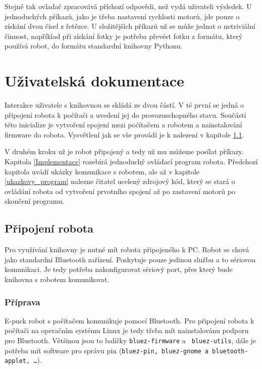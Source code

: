 \documentclass[12pt,notitlepage]{report}
\begin{document}
    Stejně tak ovladač zpracovává příchozí odpovědi, než vydá uživateli
    výsledek. U jednoduchých příkazů, jako je třeba nastavení rychlosti motorů,
    jde pouze o získání dvou čísel z řetězce. U složitějších příkazů už se může
    jednat o netriviální činnost, například při získání fotky je potřeba
    převést fotku z formátu, který používá robot, do formátu standardní
    knihovny Pythonu.

\chapter{Uživatelská dokumentace} %

    Interakce uživatele s knihovnou se skládá ze dvou částí. V té první se
    jedná o připojení robota k počítači a uvedení jej do provozuschopného
    stavu. Součástí této inicialize je vytvoření spojení mezi počítačem a
    robotem a nainstalování firmware do robota. Vysvětlení jak se vše provádí
    je k nalezení v kapitole \ref{pripojeni_robota}.

    V druhém kroku už je robot připojený a tedy už mu můžeme posílat příkazy.
    Kapitola \ref{Implementace} rozebírá jednoduchý ovládací program robota.
    Předchozí kapitola uvádí ukázky komunikace s robotem, ale až v kapitole
    \ref{ukazkovy_program} nalezne čitatel ucelený zdrojový kód, který se stará
    o ovládání robota od vytvoření prvotního spojení až po zastavení motorů po
    skončení programu.

    \section{Připojení robota}
    \label{pripojeni_robota}

    Pro využívání knihovny je nutné mít robota připojeného k PC. Robot se chová
    jako standardní Bluetooth zařízení. Poskytuje pouze jedinou službu a to
    sériovou komunikaci. Je tedy potřeba nakonfigurovat sériový port, přes
    který bude knihovna s robotem komunikovat.

    \subsection{Příprava}

    E-puck robot s počítačem komunikuje pomocí Bluetooth. Pro připojení robota
    k počítači na operačním systému Linux je tedy třeba mít nainstalovánu
    podporu pro Bluetooth. Většinou jsou to balíčky {\tt bluez-firmware} a {\tt
    bluez-utils}, dále je potřeba mít software pro správu pin ({\tt bluez-pin,
    bluez-gnome a bluetooth-applet, \ldots}).
\end{document}
